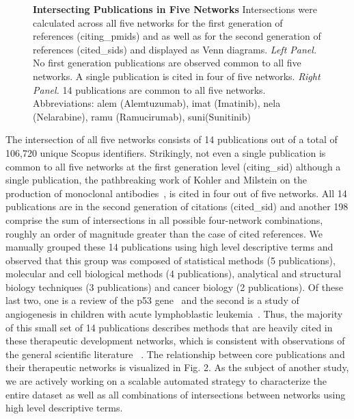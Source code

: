 \documentclass[10pt,letterpaper]{article}
\begin{document}
\begin{figure}[!h]
\centering
\scalebox{0.99}
{
\begin{subfigure}{.5\textwidth}
  \centering
  \label{fig:sub1}
\end{subfigure}
\begin{subfigure}{.5\textwidth}
  \centering
  \label{fig:sub2}
\end{subfigure}
}
\caption{{\bf Intersecting Publications in Five Networks} Intersections were calculated across all five networks for the first generation of references (citing\_pmids) and 
as well as for the second generation of references (cited\_sids) and displayed as Venn diagrams.  \emph{Left Panel.} No first generation publications are observed common to all five networks. A single publication is cited in four of five networks. \emph{Right Panel.} 14  publications are common to all five networks. Abbreviations: alem (Alemtuzumab), imat (Imatinib), nela (Nelarabine), ramu (Ramucirumab), suni(Sunitinib)}
\label{fig: test}
\end{figure}


The intersection of all five networks consists of 14 publications out of a total of 106,720 unique Scopus identifiers. Strikingly, not even a single publication is common to all five networks at the first generation level (citing\_sid) although a single publication, the pathbreaking work of Kohler and Milstein on the production of monoclonal antibodies~\cite{bibKohler}, is cited in four out of five networks. All 14 publications are in the second generation of citations (cited\_sid) and another 198 comprise the sum of intersections in all possible four-network combinations, roughly an order of magnitude greater than the case of cited references. We manually grouped these 14 publications using high level descriptive terms and observed that this group was composed of  statistical methods (5 publications), molecular and cell biological methods (4 publications), analytical and structural biology techniques (3 publications) and cancer biology (2 publications). Of these last two, one is a review of the p53 gene~\cite{bibLevine} and the second is a study of angiogenesis in children with acute lymphoblastic leukemia~\cite{bibFolkman}. Thus, the majority of this small set of 14 publications describes methods that are heavily cited in these therapeutic development networks, which is consistent with observations of the general scientific literature ~\cite{bibVanNoorden}. The relationship between core publications and their therapeutic networks is visualized in Fig. 2. As the subject of another study, we are actively working on a scalable automated strategy to characterize the entire dataset as well as all combinations of intersections between networks using high level descriptive terms.
\end{document}
